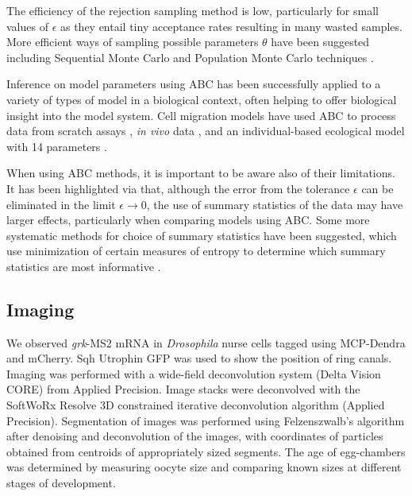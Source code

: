 \documentclass[twocolumn]{biophys}
\begin{document}
The efficiency of the rejection sampling method is low, particularly for small values of $\epsilon$ as they entail tiny acceptance rates resulting in many wasted samples. 
More efficient ways of sampling possible parameters $\theta$ have been suggested including Sequential Monte Carlo and Population Monte Carlo techniques \citep{toni2009approximate, sisson2007sequential, beaumont2009adaptive, lenormand2013adaptive}.

Inference on model parameters using ABC has been successfully applied to a variety of types of model in a biological context, often helping to offer biological insight into the model system.
Cell migration models have used ABC to process data from scratch assays \citep{johnston2014interpreting}, \textit{in vivo} data \citep{liepe2012calibrating}, and an individual-based ecological model with 14 parameters \citep{van2015calibration}. 

When using ABC methods, it is important to be aware also of their limitations. 
It has been highlighted via \citet{robert2011lack} that, although the error from the tolerance $\epsilon$ can be eliminated in the limit $\epsilon \rightarrow 0$, the use of summary statistics of the data may have larger effects, particularly when comparing models using ABC.
Some more systematic methods for choice of summary statistics have been suggested, which use minimization of certain measures of entropy to determine which summary statistics are most informative \citep{nunes2010optimal}.


\subsection{Imaging}
We observed \textit{grk}-MS2 mRNA in \textit{Drosophila} nurse cells tagged using MCP-Dendra and mCherry. 
Sqh Utrophin GFP was used to show the position of ring canals.
Imaging was performed with a wide-field deconvolution system (Delta Vision CORE) from Applied Precision. 
Image stacks were deconvolved with the SoftWoRx Resolve 3D constrained iterative deconvolution algorithm (Applied Precision). 
Segmentation of images was performed using Felzenszwalb's algorithm \citep{felzenszwalb2004efficient} after denoising and deconvolution of the images, with coordinates of particles obtained from centroids of appropriately sized segments. 
The age of egg-chambers was determined by measuring oocyte size and comparing known sizes at different stages of development.
\end{document}
